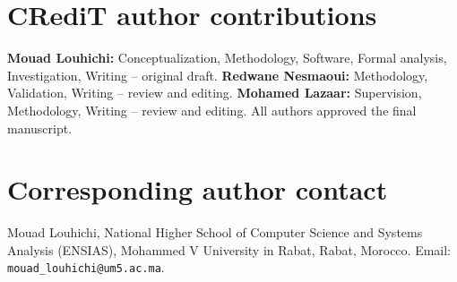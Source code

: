 \documentclass[a4paper,fleqn]{cas-sc}
\begin{document}
\section*{CRediT author contributions}
\textbf{Mouad Louhichi:} Conceptualization, Methodology, Software, Formal analysis, Investigation, Writing -- original draft.
\textbf{Redwane Nesmaoui:} Methodology, Validation, Writing -- review and editing.
\textbf{Mohamed Lazaar:} Supervision, Methodology, Writing -- review and editing.
All authors approved the final manuscript.

\section*{Corresponding author contact}
Mouad Louhichi, National Higher School of Computer Science and Systems Analysis (ENSIAS), Mohammed V University in Rabat, Rabat, Morocco. Email: \texttt{mouad\_louhichi@um5.ac.ma}.
\end{document}
